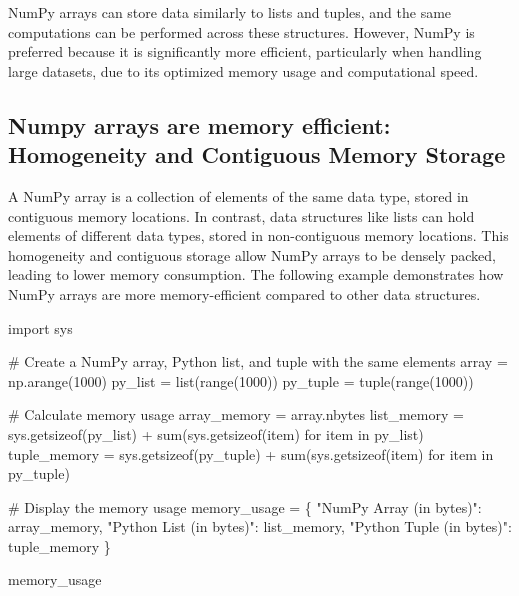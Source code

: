\documentclass[
  letterpaper,
  DIV=11,
  numbers=noendperiod]{scrreprt}
\newenvironment{Shaded}{\begin{snugshade}}{\end{snugshade}}
\newcommand{\BuiltInTok}[1]{\textcolor[rgb]{0.00,0.23,0.31}{#1}}
\newcommand{\CommentTok}[1]{\textcolor[rgb]{0.37,0.37,0.37}{#1}}
\newcommand{\ControlFlowTok}[1]{\textcolor[rgb]{0.00,0.23,0.31}{#1}}
\newcommand{\DecValTok}[1]{\textcolor[rgb]{0.68,0.00,0.00}{#1}}
\newcommand{\ImportTok}[1]{\textcolor[rgb]{0.00,0.46,0.62}{#1}}
\newcommand{\KeywordTok}[1]{\textcolor[rgb]{0.00,0.23,0.31}{#1}}
\newcommand{\NormalTok}[1]{\textcolor[rgb]{0.00,0.23,0.31}{#1}}
\newcommand{\OperatorTok}[1]{\textcolor[rgb]{0.37,0.37,0.37}{#1}}
\newcommand{\StringTok}[1]{\textcolor[rgb]{0.13,0.47,0.30}{#1}}
\begin{document}
NumPy arrays can store data similarly to lists and tuples, and the same
computations can be performed across these structures. However, NumPy is
preferred because it is significantly more efficient, particularly when
handling large datasets, due to its optimized memory usage and
computational speed.

\hypertarget{numpy-arrays-are-memory-efficient-homogeneity-and-contiguous-memory-storage}{%
\subsection{Numpy arrays are memory efficient: Homogeneity and
Contiguous Memory
Storage}\label{numpy-arrays-are-memory-efficient-homogeneity-and-contiguous-memory-storage}}

A NumPy array is a collection of elements of the same data type, stored
in contiguous memory locations. In contrast, data structures like lists
can hold elements of different data types, stored in non-contiguous
memory locations. This homogeneity and contiguous storage allow NumPy
arrays to be densely packed, leading to lower memory consumption. The
following example demonstrates how NumPy arrays are more
memory-efficient compared to other data structures.

\begin{Shaded}
\begin{Highlighting}[]
\ImportTok{import}\NormalTok{ sys}

\CommentTok{\# Create a NumPy array, Python list, and tuple with the same elements}
\NormalTok{array }\OperatorTok{=}\NormalTok{ np.arange(}\DecValTok{1000}\NormalTok{)}
\NormalTok{py\_list }\OperatorTok{=} \BuiltInTok{list}\NormalTok{(}\BuiltInTok{range}\NormalTok{(}\DecValTok{1000}\NormalTok{))}
\NormalTok{py\_tuple }\OperatorTok{=} \BuiltInTok{tuple}\NormalTok{(}\BuiltInTok{range}\NormalTok{(}\DecValTok{1000}\NormalTok{))}

\CommentTok{\# Calculate memory usage}
\NormalTok{array\_memory }\OperatorTok{=}\NormalTok{ array.nbytes}
\NormalTok{list\_memory }\OperatorTok{=}\NormalTok{ sys.getsizeof(py\_list) }\OperatorTok{+} \BuiltInTok{sum}\NormalTok{(sys.getsizeof(item) }\ControlFlowTok{for}\NormalTok{ item }\KeywordTok{in}\NormalTok{ py\_list)}
\NormalTok{tuple\_memory }\OperatorTok{=}\NormalTok{ sys.getsizeof(py\_tuple) }\OperatorTok{+} \BuiltInTok{sum}\NormalTok{(sys.getsizeof(item) }\ControlFlowTok{for}\NormalTok{ item }\KeywordTok{in}\NormalTok{ py\_tuple)}

\CommentTok{\# Display the memory usage}
\NormalTok{memory\_usage }\OperatorTok{=}\NormalTok{ \{}
    \StringTok{"NumPy Array (in bytes)"}\NormalTok{: array\_memory,}
    \StringTok{"Python List (in bytes)"}\NormalTok{: list\_memory,}
    \StringTok{"Python Tuple (in bytes)"}\NormalTok{: tuple\_memory}
\NormalTok{\}}

\NormalTok{memory\_usage}
\end{Highlighting}
\end{Shaded}
\end{document}
